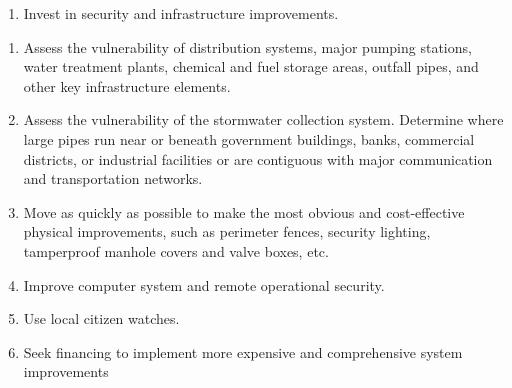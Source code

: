 \documentclass{article}
\begin{document}
\begin{enumerate}
\def\labelenumi{\arabic{enumi}.}
\setcounter{enumi}{3}
\tightlist
\item
  Invest in security and infrastructure improvements.
\end{enumerate}

\begin{enumerate}
\def\labelenumi{\alph{enumi}.}
\tightlist
\item
  Assess the vulnerability of distribution systems, major pumping
  stations, water treatment plants, chemical and fuel storage areas,
  outfall pipes, and other key infrastructure elements.
\item
  Assess the vulnerability of the stormwater collection system.
  Determine where large pipes run near or beneath government buildings,
  banks, commercial districts, or industrial facilities or are
  contiguous with major communication and transportation networks.
\item
  Move as quickly as possible to make the most obvious and
  cost-effective physical improvements, such as perimeter fences,
  security lighting, tamperproof manhole covers and valve boxes, etc.
\item
  Improve computer system and remote operational security.
\item
  Use local citizen watches.
\item
  Seek financing to implement more expensive and comprehensive system
  improvements
\end{enumerate}
\end{document}
